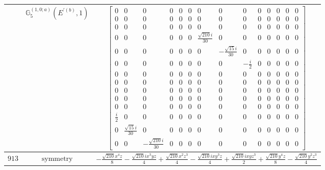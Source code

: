 \documentclass[fleqn,8pt,landscape]{jsarticle}
\begin{document}
\begin{longtable}{ccc}
$  $ & $ \mathbb{G}_{5}^{(1,0;a)}(E^{\prime(b)},1) $ & $ \begin{bmatrix} 0 & 0 & 0 & 0 & 0 & 0 & 0 & 0 & 0 & 0 & 0 & 0 & 0 & 0 \\ 0 & 0 & 0 & 0 & 0 & 0 & 0 & 0 & 0 & 0 & 0 & 0 & 0 & 0 \\ 0 & 0 & 0 & 0 & 0 & 0 & 0 & 0 & 0 & 0 & 0 & 0 & 0 & 0 \\ 0 & 0 & 0 & 0 & 0 & 0 & \frac{\sqrt{210} i}{30} & 0 & 0 & 0 & 0 & 0 & 0 & 0 \\ 0 & 0 & 0 & 0 & 0 & 0 & 0 & - \frac{\sqrt{15} i}{30} & 0 & 0 & 0 & 0 & 0 & 0 \\ 0 & 0 & 0 & 0 & 0 & 0 & 0 & 0 & - \frac{i}{2} & 0 & 0 & 0 & 0 & 0 \\ 0 & 0 & 0 & 0 & 0 & 0 & 0 & 0 & 0 & 0 & 0 & 0 & 0 & 0 \\ 0 & 0 & 0 & 0 & 0 & 0 & 0 & 0 & 0 & 0 & 0 & 0 & 0 & 0 \\ 0 & 0 & 0 & 0 & 0 & 0 & 0 & 0 & 0 & 0 & 0 & 0 & 0 & 0 \\ 0 & 0 & 0 & 0 & 0 & 0 & 0 & 0 & 0 & 0 & 0 & 0 & 0 & 0 \\ 0 & 0 & 0 & 0 & 0 & 0 & 0 & 0 & 0 & 0 & 0 & 0 & 0 & 0 \\ \frac{i}{2} & 0 & 0 & 0 & 0 & 0 & 0 & 0 & 0 & 0 & 0 & 0 & 0 & 0 \\ 0 & \frac{\sqrt{15} i}{30} & 0 & 0 & 0 & 0 & 0 & 0 & 0 & 0 & 0 & 0 & 0 & 0 \\ 0 & 0 & - \frac{\sqrt{210} i}{30} & 0 & 0 & 0 & 0 & 0 & 0 & 0 & 0 & 0 & 0 & 0 \end{bmatrix} $ \\ \hline
$ 913 $ & $ \text{symmetry} $ & $ - \frac{\sqrt{210} x^{4} z}{8} - \frac{\sqrt{210} i x^{3} y z}{4} + \frac{\sqrt{210} x^{2} z^{3}}{4} - \frac{\sqrt{210} i x y^{3} z}{4} + \frac{\sqrt{210} i x y z^{3}}{2} + \frac{\sqrt{210} y^{4} z}{8} - \frac{\sqrt{210} y^{2} z^{3}}{4} $ \\

\end{longtable}
\end{document}
